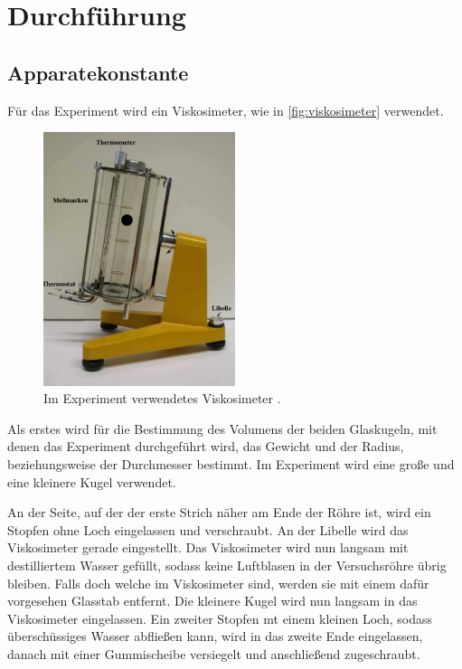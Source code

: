 \section{Durchführung}
\label{sec:Durchführung}

\subsection{Apparatekonstante}
\label{subsec:app}
Für das Experiment wird ein Viskosimeter, wie in \autoref{fig:viskosimeter} verwendet.

\begin{figure}[H]
    \centering
    \includegraphics[width=0.5\textwidth]{Dateien/Viskosimeter.png}
    \caption{Im Experiment verwendetes Viskosimeter \cite{anleitung107}.}
    \label{fig:viskosimeter}
\end{figure}

Als erstes wird für die Bestimmung des Volumens der beiden Glaskugeln, mit denen das Experiment durchgeführt wird,
das Gewicht und der Radius, beziehungsweise der Durchmesser bestimmt. Im Experiment wird eine große und eine kleinere Kugel verwendet.

An der Seite, auf der der erste Strich näher am Ende der Röhre ist, wird ein Stopfen ohne Loch eingelassen und verschraubt.
An der Libelle wird das Viskosimeter gerade eingestellt.
Das Viskosimeter wird nun langsam mit destilliertem Wasser gefüllt, sodass keine Luftblasen in der Versuchsröhre %
übrig bleiben. Falls doch welche im Viskosimeter sind, werden sie mit einem dafür vorgesehen Glasstab entfernt. Die kleinere Kugel
wird nun langsam in das Viskosimeter eingelassen.
Ein zweiter Stopfen mt einem kleinen Loch, sodass überschüssiges Wasser abfließen kann, wird in das zweite Ende eingelassen, danach mit einer
Gummischeibe versiegelt und anschließend zugeschraubt.

